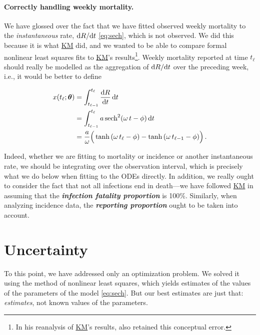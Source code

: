 \documentclass[]{interact}\usepackage[]{graphicx}\usepackage[]{xcolor}
\theoremstyle{plain}%
\theoremstyle{definition}
\theoremstyle{remark}
\newcommand{\term}[1]{{\bfseries\slshape#1}}
\newcommand{\dee}{{\rm d}}
\newcommand{\dd}[2]{{\frac{\dee{#1}}{\dee{#2}}}}
\newcommand{\dbyd}[2]{{{\dee{#1}}/{\dee{#2}}}}
\newcommand{\ddt}[1]{\dd{#1}{t}}
\newcommand{\dbydt}[1]{\dbyd{#1}{t}}
\newcommand{\dt}{\dee t}
\newcommand{\sech}{\,\textrm{sech}}
\newcommand{\KM}{\protect\hyperlink{cite.KermMcKe27}{KM}\xspace}
\newcommand{\thetavec}{{\bm{\theta}}}
\newcommand{\traj}{x}
\newcommand{\tindex}{{\ell}}
\newcommand{\ti}{t_\tindex}
\newcommand{\timo}{t_{\tindex-1}}
\begin{document}
\paragraph*{Correctly handling weekly mortality.}

We have glossed over the fact that we have fitted observed weekly
mortality to the \emph{instantaneous} rate, $\dbydt{R}$
\eqref{eq:sech}, which is not observed.  We did this because it is
what \KM did, and we wanted to be able to compare formal nonlinear
least squares fits to \KM's results\footnote{In his reanalysis of
  \KM's results, \citet{bacaermodel2012} also retained this
  conceptual error.}.  Weekly mortality reported at time $\ti$ should
really be modelled as the aggregation of $\dbydt{R}$ over the
preceding week, i.e., it would be better to define
\begin{linenomath*}
  \begin{subequations}\label{eq:sechcorrect}
    \begin{align}
      \traj(\ti;\thetavec) &=
                         \int_{\timo}^{\ti} \ddt{R}\,\dt
\label{eq:correct.mortality} \\
                       &= \int_{\timo}^{\ti}  a \sech^2{(\omega\,t - \phi)}\,\dt \\
                       &= \frac{a}{\omega}\Big(\tanh{(\omega\,\ti - \phi)}
                         - \tanh{(\omega\,\timo - \phi)}\Big) \,.
    \end{align}
  \end{subequations}
\end{linenomath*}
Indeed, whether we are fitting to mortality or incidence or another
instantaneous rate, we should be integrating over the observation
interval, which is precisely what we do below when fitting to the ODEs
directly.  In addition, we really ought to consider the fact that not
all infections end in death---we have followed \KM in assuming that
the \term{infection fatality proportion} is 100\%.  Similarly, when
analyzing incidence data, the \term{reporting proportion} ought to be
taken into account.

\section{Uncertainty}\label{sec:Uncertainty}

To this point, we have addressed only an optimization problem.  We
solved it using the method of nonlinear least squares, which yields
estimates of the values of the parameters of the model
\eqref{eq:sech}.  But our best estimates are just that:
\emph{estimates}, not known values of the parameters.
\end{document}
